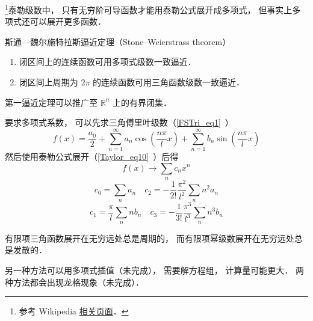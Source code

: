 
\begin{issues}
\issueDraft
\end{issues}


\footnote{参考 Wikipedia \href{https://en.wikipedia.org/wiki/Stone–Weierstrass theorem}{相关页面}．}泰勒级数中， 只有无穷阶可导函数才能用泰勒公式展开成多项式， 但事实上多项式还可以展开更多函数．

\begin{theorem}{斯通—魏尔施特拉斯逼近定理（Stone–Weierstrass theorem）}
\begin{enumerate}
斯通—魏尔施特拉斯逼近定理有两个
\item 闭区间上的连续函数可用多项式级数一致逼近．
\item 闭区间上周期为 $2\pi$ 的连续函数可用三角函数级数一致逼近．
\end{enumerate}
第一逼近定理可以推广至 $\mathbb {R}^{n}$ 上的有界闭集．
\end{theorem}

要求多项式系数， 可以先求三角傅里叶级数（\autoref{FSTri_eq1}~）
\begin{equation}
f(x) = \frac{a_0}{2} + \sum_{n = 1}^\infty a_n \cos (\frac{n\pi}{l}x) + \sum_{n = 1}^\infty b_n \sin (\frac{n\pi}{l}x)
\end{equation}
然后使用泰勒公式展开（\autoref{Taylor_eq10}~）后得
\begin{equation}
f(x) \to \sum_n c_n x^n
\end{equation}
\begin{equation}
c_0 = \sum_n a_n
\quad
c_2 = -\frac{1}{2!}\frac{\pi^2}{l^2} \sum_n n^2 a_n
\end{equation}
\begin{equation}
c_1 = \frac{\pi}{l} \sum_n n b_n
\quad
c_3 = -\frac{1}{3!}\frac{\pi^3}{l^3} \sum_n n^3 b_n
\end{equation}

有限项三角函数展开在无穷远处总是周期的， 而有限项幂级数展开在无穷远处总是发散的．

另一种方法可以用多项式插值（未完成）， 需要解方程组， 计算量可能更大． 两种方法都会出现龙格现象（未完成）．

